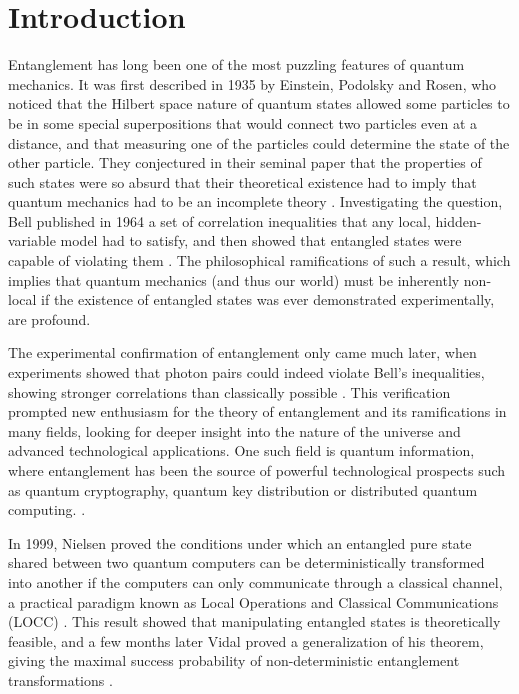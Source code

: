 \chapter*{Introduction}

Entanglement has long been one of the most puzzling features of quantum mechanics. It was first described in 1935 by Einstein, Podolsky and Rosen, who noticed that the Hilbert space nature of quantum states allowed some particles to be in some special superpositions that would connect two particles even at a distance, and that measuring one of the particles could determine the state of the other particle. They conjectured in their seminal paper that the properties of such states were so absurd that their theoretical existence had to imply that quantum mechanics had to be an incomplete theory \cite{einstein_can_1935}. Investigating the question, Bell published in 1964 a set of correlation inequalities that any local, hidden-variable model had to satisfy, and then showed that entangled states were capable of violating them \cite{bell_einstein_1964}. The philosophical ramifications of such a result, which implies that quantum mechanics (and thus our world) must be inherently non-local if the existence of entangled states was ever demonstrated experimentally, are profound.

The experimental confirmation of entanglement only came much later, when experiments showed that photon pairs could indeed violate Bell's inequalities, showing stronger correlations than classically possible \cite{aspect_experimental_1982}. This verification prompted new enthusiasm for the theory of entanglement and its ramifications in many fields, looking for deeper insight into the nature of the universe and advanced technological applications. One such field is quantum information, where entanglement has been the source of powerful technological prospects such as quantum cryptography, quantum key distribution or distributed quantum computing. \cite{horodecki_quantum_2009}.

In 1999, Nielsen proved the conditions under which an entangled pure state shared between two quantum computers can be deterministically transformed into another if the computers can only communicate through a classical channel, a practical paradigm known as Local Operations and Classical Communications (LOCC) \cite{nielsen_conditions_1999}. This result showed that manipulating entangled states is theoretically feasible, and a few months later Vidal proved a generalization of his theorem, giving the maximal success probability of non-deterministic entanglement transformations \cite{vidal_entanglement_1999}. 

